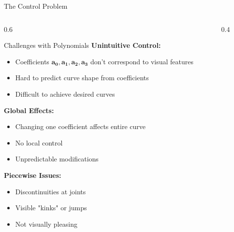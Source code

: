 \begin{frame}{The Control Problem}
  \begin{columns}
    \begin{column}{0.6\textwidth}
      \begin{conceptbox}{Challenges with Polynomials}
        \scriptsize
        \textbf{Unintuitive Control:}
        \begin{itemize}
          \item Coefficients $\mathbf{a_0}, \mathbf{a_1}, \mathbf{a_2}, \mathbf{a_3}$ don't correspond to visual features
          \item Hard to predict curve shape from coefficients
          \item Difficult to achieve desired curves
        \end{itemize}

        \vspace{0.3cm}
        \textbf{Global Effects:}
        \begin{itemize}
          \item Changing one coefficient affects entire curve
          \item No local control
          \item Unpredictable modifications
        \end{itemize}

        \vspace{0.3cm}
        \textbf{Piecewise Issues:}
        \begin{itemize}
          \item Discontinuities at joints
          \item Visible "kinks" or jumps
          \item Not visually pleasing
        \end{itemize}
      \end{conceptbox}
    \end{column}
    \begin{column}{0.4\textwidth}
      \begin{center}
\end{center}
\end{column}
\end{columns}
\end{frame}
